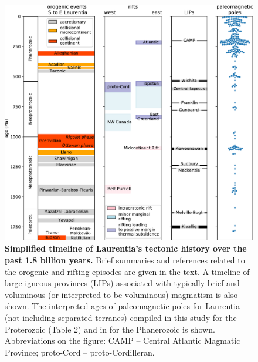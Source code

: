\documentclass[twocolumn, switch]{article} %
\begin{document}
\begin{figure}
\centering
\includegraphics[width=\textwidth]{../Figures/Fig3_Tectonic_history.pdf}
\caption{\textbf{Simplified timeline of Laurentia's tectonic history over the past 1.8 billion years.} Brief summaries and references related to the orogenic and rifting episodes are given in the text. A timeline of large igneous provinces (LIPs) associated with typically brief and voluminous (or interpreted to be voluminous) magmatism is also shown. The interpreted ages of paleomagnetic poles for Laurentia (not including separated terranes) compiled in this study for the Proterozoic (Table 2) and in \cite{Torsvik2012a} for the Phanerozoic is shown. Abbreviations on the figure: CAMP -- Central Atlantic Magmatic Province; proto-Cord -- proto-Cordilleran.}
\label{fig:tectonic_history}
\end{figure}
\end{document}
